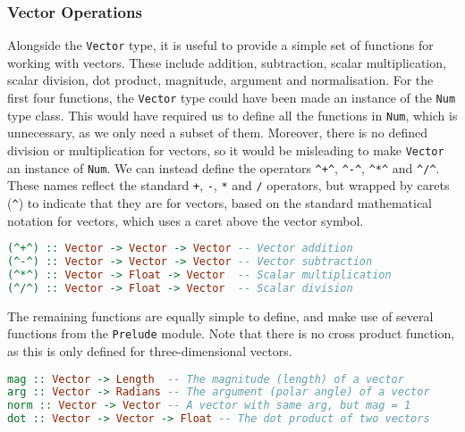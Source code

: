 \documentclass[../main.tex]{subfiles}
\begin{document}
            \subsubsection{Vector Operations}
                Alongside the \texttt{Vector} type, it is useful to provide a simple set of
                    functions for working with vectors.
                These include addition, subtraction, scalar multiplication, scalar division,
                    dot product, magnitude, argument and normalisation.
                For the first four functions, the \texttt{Vector} type could have been made an
                    instance of the \texttt{Num} type class.
                This would have required us to define all the functions in \texttt{Num}, which
                    is unnecessary, as we only need a subset of them.
                Moreover, there is no defined division or multiplication for vectors, so it
                    would be misleading to make \texttt{Vector} an instance of \texttt{Num}.
                We can instead define the operators \verb|^+^|, \verb|^-^|, \verb|^*^| and
                    \verb|^/^|.
                These names reflect the standard \verb|+|, \verb|-|, \verb|*| and \verb|/|
                    operators, but wrapped by carets (\verb|^|) to indicate that they are for
                    vectors, based on the standard mathematical notation for vectors, which uses a
                    caret above the vector symbol.

                \begin{lstlisting}[language={Haskell}, label={lst:vectorOps}, caption={The vector 
                    operators.}]
(^+^) :: Vector -> Vector -> Vector -- Vector addition
(^-^) :: Vector -> Vector -> Vector -- Vector subtraction
(^*^) :: Vector -> Float -> Vector  -- Scalar multiplication
(^/^) :: Vector -> Float -> Vector  -- Scalar division\end{lstlisting}

                The remaining functions are equally simple to define, and make use of several
                    functions from the \texttt{Prelude} module.
                Note that there is no cross product function, as this is only defined for
                    three-dimensional vectors.

                \begin{lstlisting}[language={Haskell}, label={lst:vectorFns}, caption={The remaining 
                    vector functions.}]
mag :: Vector -> Length  -- The magnitude (length) of a vector
arg :: Vector -> Radians -- The argument (polar angle) of a vector
norm :: Vector -> Vector -- A vector with same arg, but mag = 1
dot :: Vector -> Vector -> Float -- The dot product of two vectors\end{lstlisting}
\end{document}
